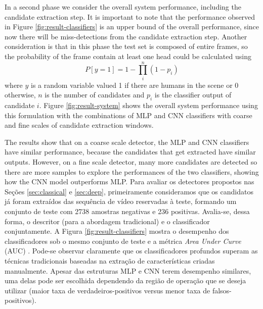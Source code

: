     \begin{figure*}[!t]
    \centering
    \label{fig:result-classifiers-all}
    \hfil
    \caption{Classifiers performance.}
    \label{fig:result-classifiers}
    \end{figure*}
    In a second phase we consider the overall system performance, including the candidate extraction step. It is important to note that the performance observed in Figure \ref{fig:result-classifiers} is an upper bound of the overall performance, since now there will be miss-detections from the candidate extraction step. Another consideration is that in this phase the test set is composed of entire frames, so the probability of the frame contain at least one head could be calculated using
    \begin{equation}
    P[y=1] = 1 - \prod_i^n (1-p_i)
    \end{equation}
    where $y$ is a random variable valued 1 if there are humans in the scene or 0 otherwise, $n$ is the number of candidates and $p_i$ is the classifier output of candidate $i$. Figure \ref{fig:result-system} shows the overall system performance using this formulation with the combinations of MLP and CNN classifiers with coarse and fine scales of candidate extraction windows.

    The results show that on a coarse scale detector, the MLP and CNN classifiers have similar performance, because the candidates that get extracted have similar outputs. However, on a fine scale detector, many more candidates are detected so there are more samples to explore the performances of the two classifiers, showing how the CNN model outperforms MLP.
    Para avaliar os detectores propostos nas Seções \ref{sec:classical} e \ref{sec:deep}, primeiramente consideramos que os candidatos já foram extraídos das sequência de vídeo reservadas à teste, formando um conjunto de teste com 2738 amostras negativas e 236 positivas. Avalia-se, dessa forma, o descritor (para a abordagem tradicional) e o classificador conjuntamente. A Figura \ref{fig:result-classifiers} mostra o desempenho dos classificadores sob o mesmo conjunto de teste e a métrica \textit{Area Under Curve} (AUC) \cite{evaluationMetrics}. Pode-se observar claramente que os classificadores profundos superam as técnicas tradicionais baseadas na extração de características criadas manualmente. Apesar das estruturas MLP e CNN terem desempenho similares, uma delas pode ser escolhida dependendo da região de operação que se deseja utilizar (maior taxa de verdadeiros-positivos versus menor taxa de falsos-positivos).
    \begin{figure*}[!t]
    \vspace{-3ex}
    \centering
    \label{fig:result-system-all-zoom}
    \label{fig:result-system}
    \hfil
    \caption{Overall system performance.}
    \end{figure*}

